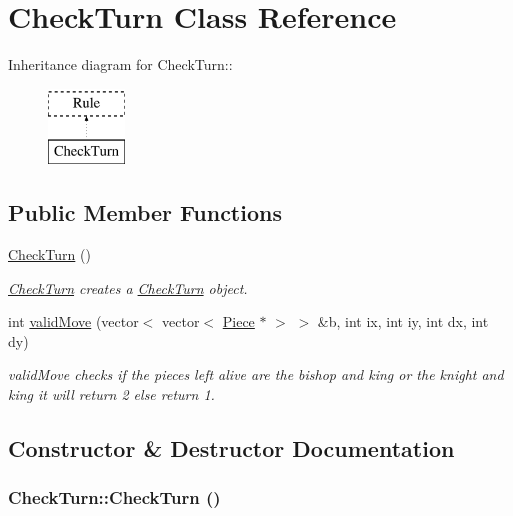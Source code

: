 \hypertarget{classCheckTurn}{
\section{CheckTurn Class Reference}
\label{classCheckTurn}
}
Inheritance diagram for CheckTurn::\begin{figure}[H]
\begin{center}
\leavevmode
\includegraphics[height=2cm]{classCheckTurn}
\end{center}
\end{figure}
\subsection*{Public Member Functions}
\begin{DoxyCompactItemize}
\item 
\hyperlink{classCheckTurn_aedd0e9efd064863ae813f80e5847b197}{CheckTurn} ()
\begin{DoxyCompactList}\small\item\em \hyperlink{classCheckTurn}{CheckTurn} creates a \hyperlink{classCheckTurn}{CheckTurn} object. \item\end{DoxyCompactList}\item 
int \hyperlink{classCheckTurn_acb5d45e0ee242eb4af3dc6a7437b39e5}{validMove} (vector$<$ vector$<$ \hyperlink{classPiece}{Piece} $\ast$ $>$ $>$ \&b, int ix, int iy, int dx, int dy)
\begin{DoxyCompactList}\small\item\em validMove checks if the pieces left alive are the bishop and king or the knight and king it will return 2 else return 1. \item\end{DoxyCompactList}\end{DoxyCompactItemize}


\subsection{Constructor \& Destructor Documentation}
\hypertarget{classCheckTurn_aedd0e9efd064863ae813f80e5847b197}{
\subsubsection[{CheckTurn}]{\setlength{\rightskip}{0pt plus 5cm}CheckTurn::CheckTurn ()}}
\label{classCheckTurn_aedd0e9efd064863ae813f80e5847b197}


